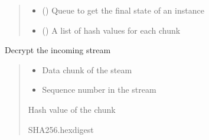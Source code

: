 \documentclass[letterpaper,10pt,english]{sphinxmanual}
\begin{document}
\begin{savenotes}
\begin{fulllineitems}
\begin{quote}
\begin{description}
\begin{itemize}
\item {} 
\sphinxAtStartPar
{} () \textendash{} Queue to get the final state of an instance

\item {} 
\sphinxAtStartPar
{} (\sphinxstyleliteralemphasis{\sphinxupquote{{[}}}\sphinxstyleliteralemphasis{\sphinxupquote{{]}}}) \textendash{} A list of hash values for each chunk

\end{itemize}

\end{description}\end{quote}

\begin{savenotes}\begin{fulllineitems}
\label{\detokenize{eezz:eezz.filesrv.TEezzFile.decrypt}}
\pysigstartsignatures
{}
\pysigstopsignatures
\sphinxAtStartPar
Decrypt the incoming stream
\begin{quote}\begin{description}
\begin{itemize}
\item {} 
\sphinxAtStartPar
{} \textendash{} Data chunk of the steam

\item {} 
\sphinxAtStartPar
{} \textendash{} Sequence number in the stream

\end{itemize}

\sphinxAtStartPar
Hash value of the chunk

\sphinxAtStartPar
SHA256.hexdigest

\end{description}\end{quote}


\end{fulllineitems}
\end{savenotes}
\end{fulllineitems}
\end{savenotes}
\end{document}

